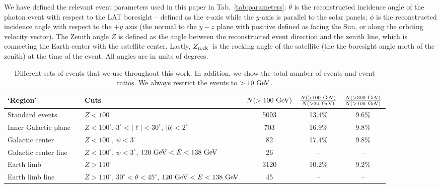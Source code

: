 \documentclass[aps,twocolumn,prd,superscriptaddress,showpacs,nofootinbib,fixfloat]{revtex4}
\newcommand{\GeV}{{\rm ~GeV}}
\newcommand{\zrock}{$Z_{\rm rock}$}
\begin{document}



We have defined the relevant event parameters used in this
paper in Tab.~\ref{tab:parameters}: $\theta$ is the
reconstructed incidence angle of the photon event with
respect to the LAT boresight -- defined as the $z$-axis
while the $y$-axis is parallel to the solar panels; $\phi$
is the reconstructed incidence angle with respect to the
$+y$ axis (the normal to the $y-z$ plane with positive
defined as facing the Sun, or along the orbiting velocity
vector). The Zenith angle $Z$ is defined as the angle
between the reconstructed event direction and the zenith
line, which is connecting the Earth center with the
satellite center.  Lastly, \zrock\ is the rocking angle of
the satellite (the the boresight angle north of the zenith)
at the time of the event.  All angles are in units of
degrees. 

\begin{table}
  \begin{tabular}{lllccc}
    \hline
    `Region' &&Cuts & $N(>100\GeV)$ & $\frac{N(>100\GeV)}{N(>30\GeV)}$ & $\frac{N(>300\GeV)}{N(>100\GeV)}$\\
    \hline
    Standard events      &  & $Z<100^\circ$ & 5093 & 13.4\% & 9.6\% \\
    Inner Galactic plane &  & $Z<100^\circ$, $3^\circ < |\ell| < 30^\circ,\ |b|<2^\circ$     & 703 & 16.9\% & 9.8\% \\
    Galactic center      &  & $Z<100^\circ$, $\psi<3^\circ$ & 82 & 17.4\% & 9.8\% \\
    Galactic center line &  & $Z<100^\circ$, $\psi<3^\circ$, $120\GeV<E<138\GeV$             & 26 & -- & -- \\
    Earth limb           &  & $Z>110^\circ$ & 3120 & 10.2\% & 9.2\% \\
    Earth limb line      &  & $Z>110^\circ$, $30^\circ<\theta<45^\circ$, $120\GeV<E<138\GeV$ & 45 & -- & -- \\ 
    \hline
  \end{tabular}
  \caption{Different sets of events that we use throughout this work. In
  addition, we show the total number of events and event ratios.
  We always restrict the events to $>10\GeV$.}
  \label{tab:regions}
\end{table}
\end{document}
